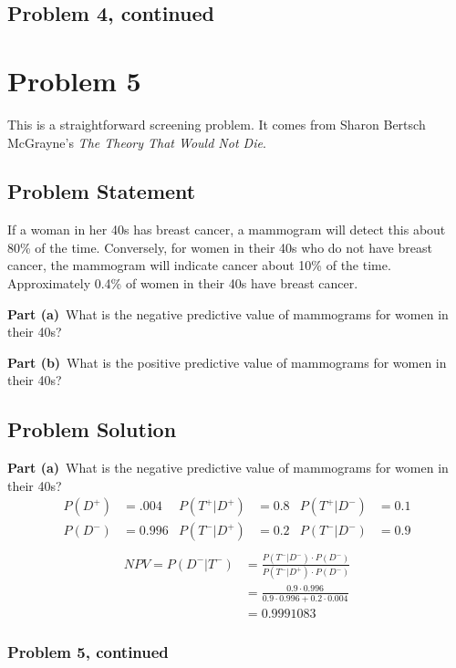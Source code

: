 \documentclass[12pt]{article}
\theoremstyle{definition}
\begin{document}
\newpage
\subsection*{Problem 4, continued}


\newpage
\section*{Problem 5}

This is a straightforward screening problem. It comes from Sharon Bertsch McGrayne's {\em The Theory That Would Not Die}.

\subsection*{Problem Statement}

If a woman in her 40s has breast cancer, a mammogram will detect this about 80\% of the time. Conversely, for women in their 40s who do not have breast cancer, the mammogram will indicate cancer about 10\% of the time. Approximately 0.4\% of women in their 40s have breast cancer.

\bigskip
\noindent
{\bf Part (a)}\ What is the negative predictive value of mammograms for women in their 40s?

\bigskip
\noindent
{\bf Part (b)}\ What is the positive predictive value of mammograms for women in their 40s?


\subsection*{Problem Solution}

{\bf Part (a)}\ What is the negative predictive value of mammograms for women in their 40s?
\begin{align*}
P(D^+) &= .004 &P(T^+|D^+) &= 0.8 &P(T^+|D^-) &= 0.1\\
P(D^-)&= 0.996 &P(T^-|D^+) &= 0.2 &P(T^-|D^-) &= 0.9\\
\end{align*}
\begin{align*}
NPV = P(D^-|T^-) &= \frac{P(T^-|D^-)\cdot P(D^-)}{P(T^-|D^+)\cdot P(D^-)}\\
&= \frac{0.9 \cdot 0.996}{0.9 \cdot 0.996 + 0.2 \cdot 0.004}\\
&= 0.9991083
\end{align*}

\newpage
\subsubsection*{Problem 5, continued}
\end{document}
